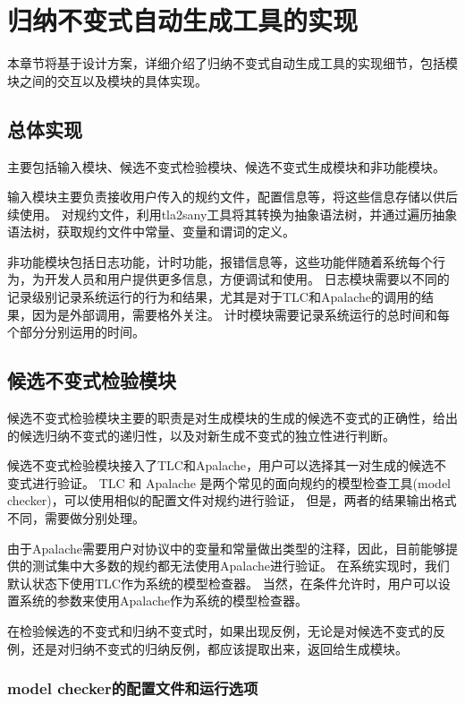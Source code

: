 \chapter{归纳不变式自动生成工具的实现}\label{chap:implementation}

本章节将基于设计方案，详细介绍了归纳不变式自动生成工具的实现细节，包括模块之间的交互以及模块的具体实现。

\section{总体实现}
主要包括输入模块、候选不变式检验模块、候选不变式生成模块和非功能模块。

输入模块主要负责接收用户传入的\TLA 规约文件，配置信息等，将这些信息存储以供后续使用。
对\TLA 规约文件，利用tla2sany工具将其转换为抽象语法树，并通过遍历抽象语法树，获取规约文件中常量、变量和谓词的定义。

非功能模块包括日志功能，计时功能，报错信息等，这些功能伴随着系统每个行为，为开发人员和用户提供更多信息，方便调试和使用。
日志模块需要以不同的记录级别记录系统运行的行为和结果，尤其是对于TLC和Apalache的调用的结果，因为是外部调用，需要格外关注。
计时模块需要记录系统运行的总时间和每个部分分别运用的时间。

\section{候选不变式检验模块}

候选不变式检验模块主要的职责是对生成模块的生成的候选不变式的正确性，给出的候选归纳不变式的递归性，以及对新生成不变式的独立性进行判断。

候选不变式检验模块接入了TLC和Apalache，用户可以选择其一对生成的候选不变式进行验证。
TLC 和 Apalache 是两个常见的面向\TLA 规约的模型检查工具(model checker)，可以使用相似的配置文件对规约进行验证，
但是，两者的结果输出格式不同，需要做分别处理。

由于Apalache需要用户对协议中的变量和常量做出类型的注释，因此，目前能够提供的测试集中大多数的规约都无法使用Apalache进行验证。
在系统实现时，我们默认状态下使用TLC作为系统的模型检查器。
当然，在条件允许时，用户可以设置系统的参数来使用Apalache作为系统的模型检查器。

在检验候选的不变式和归纳不变式时，如果出现反例，无论是对候选不变式的反例，还是对归纳不变式的归纳反例，都应该提取出来，返回给生成模块。

\subsection{model checker的配置文件和运行选项}

